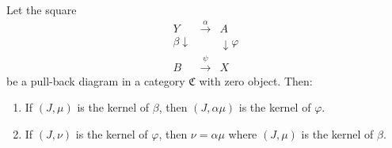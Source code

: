 Let the square
$$
\begin{array}{ccc}
Y & \xrightarrow{\alpha} & A \\
{\scriptstyle\beta}\downarrow & & \downarrow{\scriptstyle\varphi} \\
B & \xrightarrow{\psi} & X
\end{array}
$$
be a pull-back diagram in a category $\mathfrak{C}$ with zero object. Then:
\begin{enumerate}
\item[(i)] If $(J, \mu)$ is the kernel of $\beta$, then $(J, \alpha \mu)$ is the kernel of $\varphi$.
\item[(ii)] If $(J, \nu)$ is the kernel of $\varphi$, then $\nu = \alpha \mu$ where $(J, \mu)$ is the kernel of $\beta$.
\end{enumerate}
